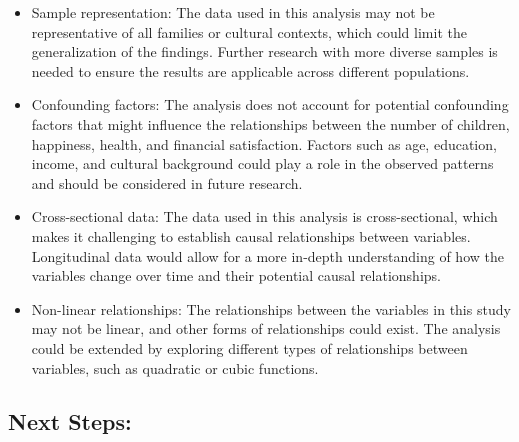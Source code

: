 \documentclass[
  letterpaper,
  DIV=11,
  numbers=noendperiod]{scrartcl}
\providecommand{\tightlist}{%
  \setlength{\itemsep}{0pt}\setlength{\parskip}{0pt}}\usepackage{longtable,booktabs,array}
\begin{document}
\begin{itemize}
\tightlist
\item
  Sample representation: The data used in this analysis may not be
  representative of all families or cultural contexts, which could limit
  the generalization of the findings. Further research with more diverse
  samples is needed to ensure the results are applicable across
  different populations.
\item
  Confounding factors: The analysis does not account for potential
  confounding factors that might influence the relationships between the
  number of children, happiness, health, and financial satisfaction.
  Factors such as age, education, income, and cultural background could
  play a role in the observed patterns and should be considered in
  future research.
\item
  Cross-sectional data: The data used in this analysis is
  cross-sectional, which makes it challenging to establish causal
  relationships between variables. Longitudinal data would allow for a
  more in-depth understanding of how the variables change over time and
  their potential causal relationships.
\item
  Non-linear relationships: The relationships between the variables in
  this study may not be linear, and other forms of relationships could
  exist. The analysis could be extended by exploring different types of
  relationships between variables, such as quadratic or cubic functions.
\end{itemize}

\hypertarget{next-steps}{%
\subsection{Next Steps:}\label{next-steps}}
\end{document}
